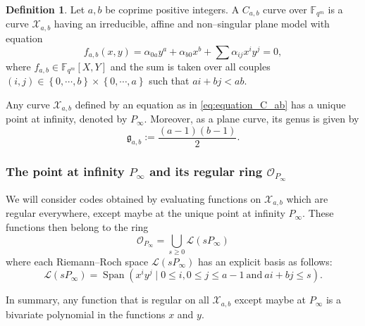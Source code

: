 \documentclass[a4paper]{amsart}
\theoremstyle{definition}
\newtheorem{definition}[thm]{Definition}
\theoremstyle{remark}
\newcommand{\calL}{\mathcal{L}}
\newcommand{\calO}{\mathcal{O}}
\newcommand{\calX}{\mathcal{X}}
\newcommand{\fqm}{\mathbb{F}_{q^m}}
\newcommand{\set}[1]{\left\{#1\right\}}
\newcommand{\Span}[1]{\operatorname{Span}\left(#1\right)}
\begin{document}
\begin{definition} \label{def:C_ab_curves} 
Let $a,b$ be coprime positive integers. A $C_{a,b}$ curve over $\fqm$ is a curve $\calX_{a,b}$ having an irreducible, affine and non--singular plane model with equation
\begin{equation} \label{eq:equation_C_ab}
f_{a,b}(x,y) = \alpha_{0a}y^a + \alpha_{b0}x^b + \sum \alpha_{ij}x^iy^j = 0,
\end{equation}
where $f_{a,b} \in \fqm[X,Y]$ and the sum is taken over all couples $(i,j) \in \set{0,\cdots,b} \times \set{0,\cdots,a}$ such that $ai+bj < ab$.
\end{definition}
Any curve $\calX_{a,b}$ defined by an equation as in \eqref{eq:equation_C_ab} has a unique point at infinity, denoted by $P_{\infty}$. Moreover, as a plane curve, its genus is given by
\[\mathfrak{g}_{a,b}:=\dfrac{(a-1)(b-1)}{2}.\]

\subsubsection{The point at infinity $P_\infty$ and its regular ring $\calO_{P_\infty}$}

We will consider codes obtained by evaluating functions on $\calX_{a,b}$ which are regular everywhere, except maybe at the unique point at infinity $P_\infty$. These functions then belong to the ring 
\begin{equation}\label{eq:O_Pinf}
\mathcal{O}_{P_\infty}=\bigcup_{s \geq 0} \calL(s P_\infty)
\end{equation} %
where each Riemann--Roch space $\calL(s P_\infty)$ has an explicit basis as follows:
\begin{equation} \label{eq:basis_L(sP_inf)}
    \calL(sP_{\infty}) = \Span{x^iy^j \mid 0 \leq i, 0\leq j\leq a-1 \ \mathrm{and} \ ai+bj \leq s}.
\end{equation}

In summary, any function that is regular on all $\calX_{a,b}$ except maybe at $P_\infty$ is a bivariate polynomial in the functions $x$ and $y$. 
\end{document}
